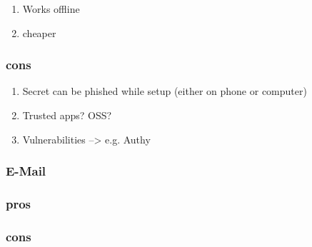\begin{enumerate}
	\item Works offline
	\item cheaper
\end{enumerate}

\subsubsection{cons}

\begin{enumerate}
	\item Secret can be phished while setup (either on phone or computer)
	\item Trusted apps? OSS?
	\item Vulnerabilities --> e.g. Authy
\end{enumerate}

\subsubsection{E-Mail}

\subsubsection{pros}

\subsubsection{cons}
